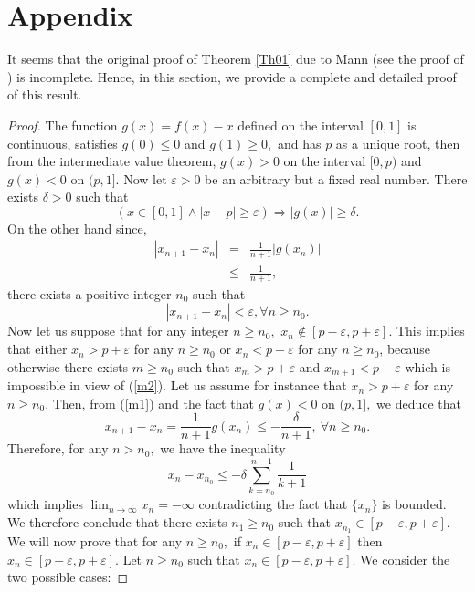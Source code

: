 \documentclass[11pt]{amsart}%
\theoremstyle{plain}
\numberwithin{equation}{section}
\begin{document}
\section{Appendix}
It seems that the original proof of Theorem \ref{Th01} due to Mann (see the proof of \cite[Theorem 4] {Man}) is incomplete. Hence, in this section, we provide a complete and detailed proof of this result.
\begin{proof}
The function $g(x)=f(x)-x$ defined on the interval $[0,1]$ is continuous,
satisfies $g(0)\leq 0$ and $g(1)\geq 0,$ and has $p$ as a unique root, then
from the intermediate value theorem, $g(x)>0$ on the interval $[0,p)$ and $%
g(x)<0$ on $(p,1].$ Now let $\varepsilon >0$ be an arbitrary but a fixed
real number. There exists $\delta >0$ such that
\begin{equation}
(x\in [0,1]\wedge \left\vert x-p\right\vert \geq \varepsilon
)\Rightarrow \left\vert g(x)\right\vert \geq \delta .  \label{m1}
\end{equation}%
On the other hand since,
\begin{eqnarray*}
\left\vert x_{n+1}-x_{n}\right\vert  &=&\frac{1}{n+1}\left\vert
g(x_{n})\right\vert  \\
&\leq &\frac{1}{n+1},
\end{eqnarray*}%
there exists a positive integer $n_{0}$ such that%
\begin{equation}
\left\vert x_{n+1}-x_{n}\right\vert <\varepsilon , \forall n\geq n_{0}.  \label{m2}
\end{equation}%
Now let us suppose that for any integer $n\geq n_{0},$ $x_{n}\notin [p-\varepsilon ,p+\varepsilon ].$ This implies that
either $x_{n}>p+\varepsilon $ for any $n\geq n_{0}$ or $x_{n}<p-\varepsilon $
for any $n\geq n_{0}$, because otherwise there exists $m\geq n_0$ such that $x_m>p+\varepsilon $ and  $x_{m+1}<p-\varepsilon $ which is impossible in view of (\ref{m2}). Let us assume for instance that $x_{n}>p+\varepsilon $
for any $n\geq n_{0}.$ Then, from (\ref{m1}) and the fact that $g(x)<0$ on $%
(p,1],$ we deduce that%
\[
x_{n+1}-x_{n}=\frac{1}{n+1}g(x_{n})\leq -\frac{\delta }{n+1},~\forall n\geq
n_{0}.
\]%
Therefore, for any $n>n_{0},$ we have the inequality%
\[
x_{n}-x_{n_{0}}\leq -\delta \sum_{k=n_{0}}^{n-1}\frac{1}{k+1}
\]%
which implies $\lim_{n\rightarrow \infty }x_{n}=-\infty $ contradicting the
fact that $\{x_{n}\}$ is bounded. We therefore conclude that there exists $%
n_{1}\geq n_{0}$ such that $x_{n_{1}}\in [p-\varepsilon
,p+\varepsilon ].$ We will now prove that for any $n\geq n_{0},$ if $x_{n}\in
[p-\varepsilon ,p+\varepsilon ]$ then $x_{n}\in [p-\varepsilon
,p+\varepsilon ]$. Let $n\geq n_{0}$ such that $x_{n}\in [
p-\varepsilon ,p+\varepsilon ].$ We consider the two possible cases:


\end{proof}
\end{document}
